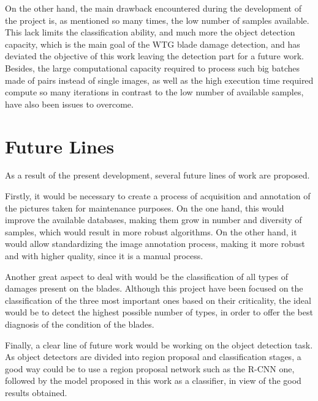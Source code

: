 On the other hand, the main drawback encountered during the development of the project is, as mentioned so many times, the low number of samples available. This lack limits the classification ability, and much more the object detection capacity, which is the main goal of the WTG blade damage detection, and has deviated the objective of this work leaving the detection part for a future work. Besides, the large computational capacity required to process such big batches made of pairs instead of single images, as well as the high execution time required compute so many iterations in contrast to the low number of available samples, have also been issues to overcome.


\section{Future Lines}

As a result of the present development, several future lines of work are proposed. 

Firstly, it would be necessary to create a process of acquisition and annotation of the pictures taken for maintenance purposes. On the one hand, this would improve the available databases, making them grow in number and diversity of samples, which would result in more robust algorithms. On the other hand, it would allow standardizing the image annotation process, making it more robust and with higher quality, since it is a manual process.

Another great aspect to deal with would be the classification of all types of damages present on the blades. Although this project have been focused on the classification of the three most important ones based on their criticality, the ideal would be to detect the highest possible number of types, in order to offer the best diagnosis of the condition of the blades.

Finally, a clear line of future work would be working on the object detection task. As object detectors are divided into region proposal and classification stages, a good way could be to use a region proposal network such as the R-CNN one, followed by the model proposed in this work as a classifier, in view of the good results obtained.


























